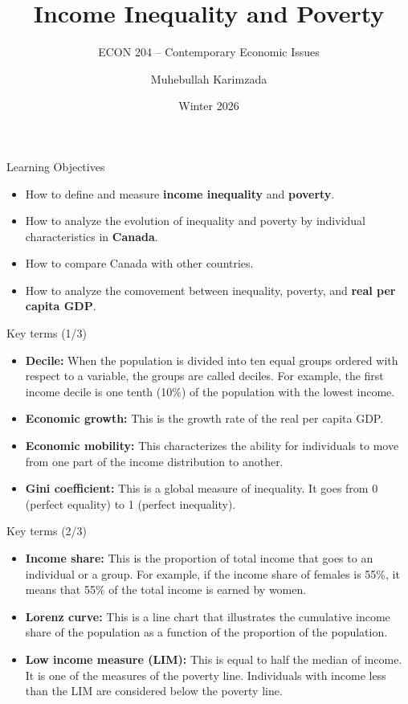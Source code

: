 \documentclass[aspectratio=169]{beamer}
\title[Contemporary Economic Issues]{Income Inequality and Poverty}
\subtitle{ECON 204 -- Contemporary Economic Issues}
\author{Muhebullah Karimzada}
\date{Winter 2026}
\begin{document}
\begin{frame}
\transfade
\titlepage
\end{frame}



\begin{frame}{Learning Objectives}
\transfade
\begin{itemize}
\item How to define and measure \textbf{income inequality} and \textbf{poverty}.
\item How to analyze the evolution of inequality and poverty by individual characteristics in \textbf{Canada}.
\item How to compare Canada with other countries.
\item How to analyze the comovement between inequality, poverty, and \textbf{real per capita GDP}.
\end{itemize}
\end{frame}

\begin{frame}{Key terms (1/3)}
\transfade
\begin{itemize}
\item \textbf{Decile:} When the population is divided into ten equal groups ordered with respect to a variable, the groups are called deciles. For example, the first income decile is one tenth (10\%) of the population with the lowest income.\\

\item \textbf{Economic growth:} This is the growth rate of the real per capita GDP.\\

\item \textbf{Economic mobility:} This characterizes the ability for individuals to move from one part of the income distribution to another.\\

\item \textbf{Gini coefficient:} This is a global measure of inequality. It goes from 0 (perfect equality) to 1 (perfect inequality).
\end{itemize}
\end{frame}

\begin{frame}{Key terms (2/3)}
\transfade
\begin{itemize}
\item \textbf{Income share:} This is the proportion of total income that goes to an individual or a group. For example, if the income share of females is 55\%, it means that 55\% of the total income is earned by women.
\item \textbf{Lorenz curve:} This is a line chart that illustrates the cumulative income share of the population as a function of the proportion of the population.
\item \textbf{Low income measure (LIM):} This is equal to half the median of income. It is one of the measures of the poverty line. Individuals with income less than the LIM are considered below the poverty line.

\end{itemize}
\end{frame}
\end{document}
